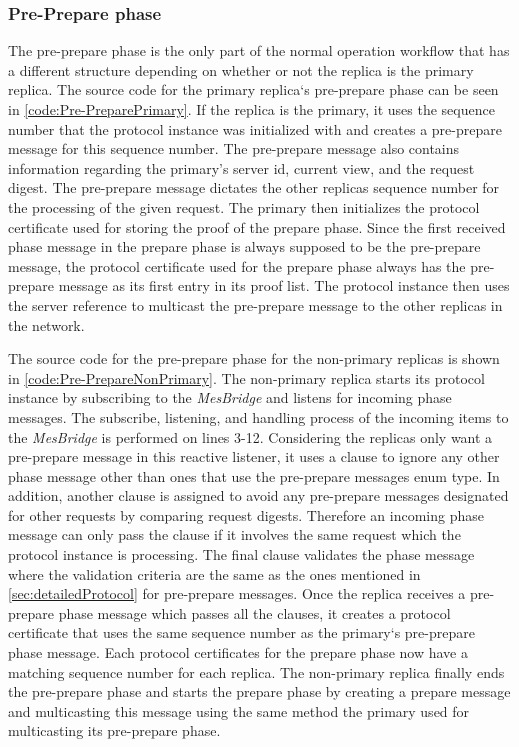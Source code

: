 \subsubsection{Pre-Prepare phase}
\label{sec:prepare}
\iffalse
The pre-prepare phase is the only part of the normal operation workflow that has a different structure depending on whether or not the replica is the primary replica. The source code for the primary replica`s pre-prepare phase can be seen in \autoref{code:Pre-PreparePrimary}. If the replica is the primary, it uses the sequence number that the protocol instance was initialized with and creates a pre-prepare message for this sequence number. The pre-prepare message also contains information regarding the primary’s server id, current view, and the request digest. The pre-prepare message dictates the other replicas sequence number for the processing of the given request. The primary then initializes the protocol certificate used for storing the proof of the prepare phase. Since the first received phase message in the prepare phase is always supposed to be the pre-prepare message, the protocol certificate used for the prepare phase always has the pre-prepare message as its first entry in its proof list. The protocol instance then uses the server reference to multicast the pre-prepare message to the other replicas in the network. 

The source code for the pre-prepare phase for the non-primary replicas is shown in \autoref{code:Pre-PrepareNonPrimary}. The non-primary replica starts its protocol instance by subscribing to the  \emph{MesBridge} and listens for incoming phase messages. The subscribe, listening, and handling process of the incoming items to the \emph{MesBridge} is performed on lines 3-12. Considering the replicas only want a pre-prepare message in this reactive listener, it uses a  clause to ignore any other phase message other than ones that use the pre-prepare messages enum type. In addition, another  clause is assigned to avoid any pre-prepare messages designated for other requests by comparing request digests. Therefore an incoming phase message can only pass the  clause if it involves the same request which the protocol instance is processing. The final  clause validates the phase message where the validation criteria are the same as the ones mentioned in \autoref{sec:detailedProtocol} for pre-prepare messages. Once the replica receives a pre-prepare phase message which passes all the  clauses, it creates a protocol certificate that uses the same sequence number as the primary`s pre-prepare phase message. Each protocol certificates for the prepare phase now have a matching sequence number for each replica. The non-primary replica finally ends the pre-prepare phase and starts the prepare phase by creating a prepare message and multicasting this message using the same method the primary used for multicasting its pre-prepare phase.

